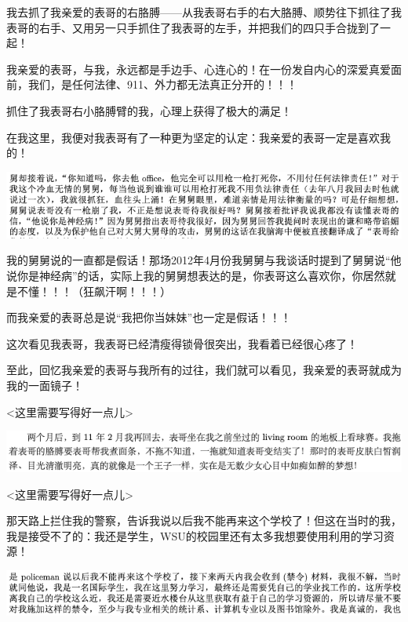 \documentclass[9pt, b5paper]{article}
\begin{document}
我去抓了我亲爱的表哥的右胳膊——从我表哥右手的右大胳膊、顺势往下抓往了我表哥的右手、又用另一只手抓住了我表哥的左手，并把我们的四只手合拢到了一起！

我亲爱的表哥，与我，永远都是手边手、心连心的！在一份发自内心的深爱真爱面前，我们，是任何法律、911、外力都无法真正分开的！！！

抓住了我表哥右小胳膊臂的我，心理上获得了极大的满足！

在我这里，我便对我表哥有了一种更为坚定的认定：我亲爱的表哥一定是喜欢我的！

\begin{center}
\includegraphics[width=.9\linewidth]{./pic/backups_plans_20210506_111450.png}
\end{center}

我的舅舅说的一直都是假话！那场2012年4月份我舅舅与我谈话时提到了舅舅说“他说你是神经病”的话，实际上我的舅舅想表达的是，你表哥这么喜欢你，你居然就是不懂！！！（狂飙汗啊！！！）

而我亲爱的表哥总是说“我把你当妹妹”也一定是假话！！！

这次看见我表哥，我表哥已经清瘦得锁骨很突出，我看着已经很心疼了！

至此，回忆我亲爱的表哥与我所有的过往，我们就可以看见，我亲爱的表哥就成为我的一面镜子！

<这里需要写得好一点儿>

\begin{center}
\includegraphics[width=.9\linewidth]{./pic/backups_plans_20210506_100552.png}
\end{center}

<这里需要写得好一点儿>

那天路上拦住我的警察，告诉我说以后我不能再来这个学校了！但这在当时的我，我是接受不了的：我还是学生，WSU的校园里还有太多我想要使用利用的学习资源！

\begin{center}
\includegraphics[width=.9\linewidth]{./pic/backups_plans_20210505_205235.png}
\end{center}
\end{document}
